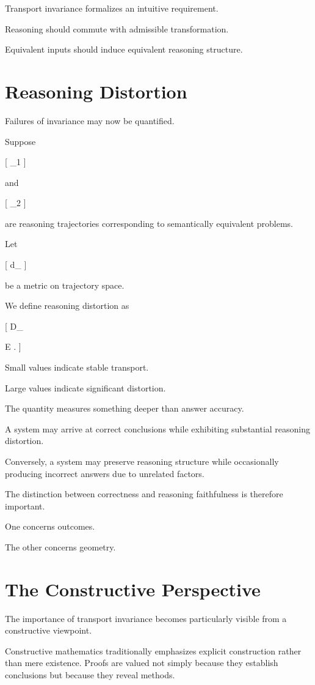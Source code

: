 \documentclass[11pt,oneside,openany]{book}
\begin{document}
Transport invariance formalizes an intuitive requirement.

Reasoning should commute with admissible transformation.

Equivalent inputs should induce equivalent reasoning structure.

\section{Reasoning Distortion}

Failures of invariance may now be quantified.

Suppose

[
\gamma_1
]

and

[
\gamma_2
]

are reasoning trajectories corresponding to semantically equivalent problems.

Let

[
d_\Gamma
]

be a metric on trajectory space.

We define reasoning distortion as

[
D_{}

\mathbb E
.
]

Small values indicate stable transport.

Large values indicate significant distortion.

The quantity measures something deeper than answer accuracy.

A system may arrive at correct conclusions while exhibiting substantial reasoning distortion.

Conversely, a system may preserve reasoning structure while occasionally producing incorrect answers due to unrelated factors.

The distinction between correctness and reasoning faithfulness is therefore important.

One concerns outcomes.

The other concerns geometry.

\section{The Constructive Perspective}

The importance of transport invariance becomes particularly visible from a constructive viewpoint.

Constructive mathematics traditionally emphasizes explicit construction rather than mere existence. Proofs are valued not simply because they establish conclusions but because they reveal methods.
\end{document}
